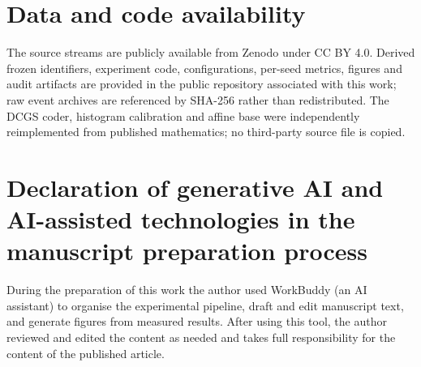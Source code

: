 \documentclass[preprint,12pt]{elsarticle}
\begin{document}
\section*{Data and code availability}
The source streams are publicly available from Zenodo \cite{poursafaei2022dataset} under CC BY 4.0. Derived frozen identifiers, experiment code, configurations, per-seed metrics, figures and audit artifacts are provided in the public repository associated with this work; raw event archives are referenced by SHA-256 rather than redistributed. The DCGS coder, histogram calibration and affine base were independently reimplemented from published mathematics; no third-party source file is copied.

\section*{Declaration of generative AI and AI-assisted technologies in the manuscript preparation process}
During the preparation of this work the author used WorkBuddy (an AI assistant) to organise the experimental pipeline, draft and edit manuscript text, and generate figures from measured results. After using this tool, the author reviewed and edited the content as needed and takes full responsibility for the content of the published article.


\end{document}
